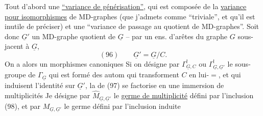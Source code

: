 Tout d'abord une \uline{``variance de générisation''}, qui est composée de la \uline{variance pour isomorphismes} de MD-graphes (que j'admets comme ``triviale'', et qu'il est inutile de préciser) et une ``variance de passage au quotient de MD-graphes''.
Soit donc $\underline G'$ un MD-graphe quotient de $\underline G$ -- par un ens.  d'arêtes du graphe $G$ sous-jacent à $\underline G$,
\[
(96)\qquad\underline G'=\underline G/C.
\]
On a alors un  morphismes canoniques
Si on désigne par $\Gamma^!_{\underline G,C}$ ou $\Gamma^!_{\underline G,\underline G'}$ le sous-groupe de $\Gamma_{\underline G}$ qui est formé des autom qui transforment $C$ en lui-$=$, et qui induisent l'identité sur $\underline G'$, la    de (97) se factorise  en une immersion de multiplicités
Je désigne par $\widehat M_{\underline G,\underline G'}$ le \uline{germe de multiplicité} défini par l'inclusion (98), et par $M_{\underline G,\underline G'}$ le germe défini par l'inclusion induite
